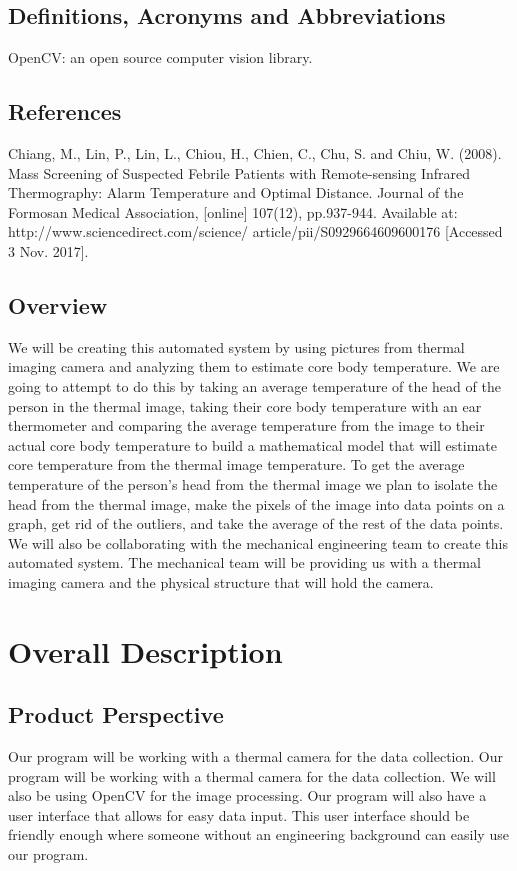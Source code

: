 \documentclass[10pt, draftclsnofoot, onecolumn]{IEEEtran}
\begin{document}
	\subsection{Definitions, Acronyms and Abbreviations}
	    OpenCV: an open source computer vision library.
	\subsection{References}
	    Chiang, M., Lin, P., Lin, L., Chiou, H., Chien, C., Chu, S. and Chiu, W. (2008). Mass Screening of Suspected Febrile Patients with Remote-sensing Infrared Thermography: Alarm Temperature and Optimal Distance. Journal of the Formosan Medical Association, [online] 107(12), pp.937-944. Available at: http://www.sciencedirect.com/science/
	    article/pii/S0929664609600176 [Accessed 3 Nov. 2017].
	\subsection{Overview}
	    We will be creating this automated system by using pictures from thermal imaging camera and analyzing them to estimate core body temperature. We are going to attempt to do this by taking an average temperature of the head of the person in the thermal image, taking their core body temperature with an ear thermometer and comparing the average temperature from the image to their actual core body temperature to build a mathematical model that will estimate core temperature from the thermal image temperature. To get the average temperature of the person’s head from the thermal image we plan to isolate the head from the thermal image, make the pixels of the image into data points on a graph, get rid of the outliers, and take the average of the rest of the data points. We will also be collaborating with the mechanical engineering team to create this automated system. The mechanical team will be providing us with a thermal imaging camera and the physical structure that will hold the camera.
\section{Overall Description}
	\subsection{Product Perspective}
		Our program will be working with a thermal camera for the data collection. Our program will be working with a thermal camera for the data collection. We will also be using OpenCV for the image processing. Our program will also have a user interface that allows for easy data input. This user interface should be friendly enough where someone without an engineering background can easily use our program. 
\end{document}
